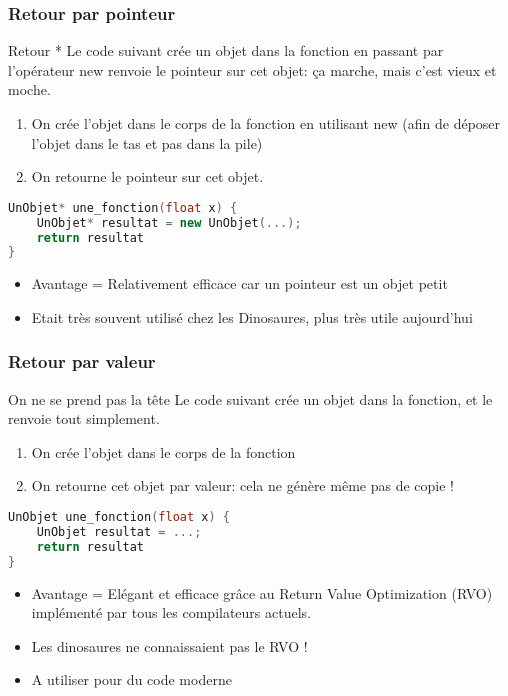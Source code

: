 \documentclass{beamer}
\begin{document}
\begin{frame}[fragile=singleslide,shrink=20]
\frametitle {Retour par pointeur}

\begin{block}{Retour *}
Le code suivant crée un objet dans la fonction en passant par l'opérateur new renvoie le pointeur sur cet objet:
ça marche, mais c'est vieux et moche.

\begin{enumerate}
\item On crée l'objet dans le corps de la fonction en utilisant new (afin de déposer l'objet dans le tas et pas dans la pile)
\item On retourne le pointeur sur cet objet.
\end{enumerate}
\end{block}

\begin{lstlisting}[language=c++]
UnObjet* une_fonction(float x) {
    UnObjet* resultat = new UnObjet(...);
    return resultat
}
\end{lstlisting}

\begin{itemize}
\item Avantage = Relativement efficace car un pointeur est un objet petit
\item Etait très souvent utilisé chez les Dinosaures, plus très utile aujourd'hui
\end{itemize}
\end{frame}

\begin{frame}[fragile=singleslide,shrink=20]
\frametitle {Retour par valeur}

\begin{block}{On ne se prend pas la tête}
Le code suivant crée un objet dans la fonction, et le renvoie tout simplement.

\begin{enumerate}
\item On crée l'objet dans le corps de la fonction
\item On retourne cet objet par valeur: cela ne génère même pas de copie !
\end{enumerate}
\end{block}

\begin{lstlisting}[language=c++]
UnObjet une_fonction(float x) {
    UnObjet resultat = ...;
    return resultat
}
\end{lstlisting}

\begin{itemize}
\item Avantage = Elégant et efficace grâce au Return Value Optimization (RVO) implémenté par tous les compilateurs actuels.
\item Les dinosaures ne connaissaient pas le RVO !
\item A utiliser pour du code moderne
\end{itemize}
\end{frame}
\end{document}
